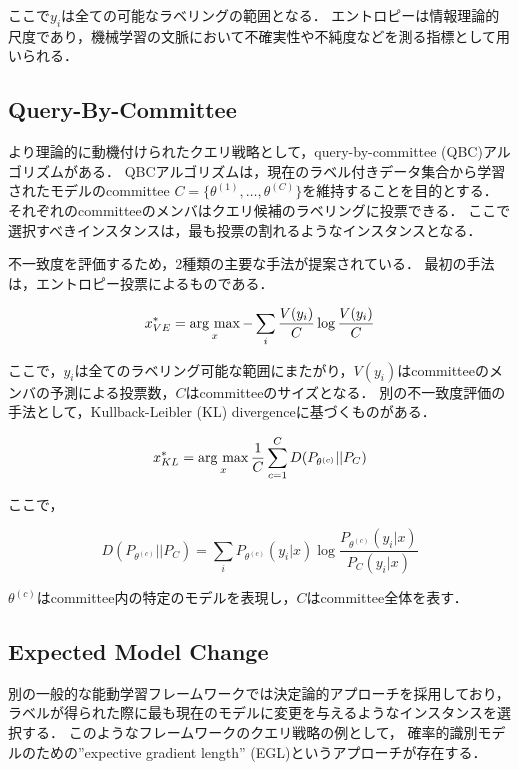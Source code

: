 \documentclass[11pt]{report}
\newcommand{\argmax}{\mathop{\rm arg~max}\limits}
\begin{document}
ここで$y_i$は全ての可能なラベリングの範囲となる．
エントロピーは情報理論的尺度であり，機械学習の文脈において不確実性や不純度などを測る指標として用いられる．

\subsection{Query-By-Committee}
より理論的に動機付けられたクエリ戦略として，query-by-committee (QBC)アルゴリズム\cite{seung1992query}がある．
QBCアルゴリズムは，現在のラベル付きデータ集合から学習されたモデルのcommittee $C = \{\theta^{(1)},\ldots,\theta^{(C)} \}$を維持することを目的とする．
それぞれのcommitteeのメンバはクエリ候補のラベリングに投票できる．
ここで選択すべきインスタンスは，最も投票の割れるようなインスタンスとなる．

不一致度を評価するため，2種類の主要な手法が提案されている．
最初の手法は，エントロピー投票によるものである\cite{dagan1995committee}．

\begin{equation}
    x_{VE}^* = \argmax_{x} - \sum_{i} \frac{V(y_i)}{C} \log \frac{V(y_i)}{C}
\end{equation}

ここで，$y_i$は全てのラベリング可能な範囲にまたがり，$V(y_i)$はcommitteeのメンバの予測による投票数，$C$はcommitteeのサイズとなる．
別の不一致度評価の手法として，Kullback-Leibler (KL) divergenceに基づくものがある\cite{mccallumzy1998employing}．

\begin{equation}
    x_{KL}^* = \argmax_{x} \frac{1}{C} \sum^{C}_{c=1} D(P_{\theta^{(c)}}||P_{C})
\end{equation}

ここで，

\begin{equation}
    D(P_{\theta^{(c)}}||P_{C}) = \sum_{i} P_{\theta^{(c)}}(y_i|x) \log \frac{P_{\theta^{(c)}}(y_i|x)}{P_C(y_i|x)}
\end{equation}

$\theta^{(c)}$はcommittee内の特定のモデルを表現し，$C$はcommittee全体を表す．

\subsection{Expected Model Change}
別の一般的な能動学習フレームワークでは決定論的アプローチを採用しており，ラベルが得られた際に最も現在のモデルに変更を与えるようなインスタンスを選択する．
このようなフレームワークのクエリ戦略の例として，
確率的識別モデルのための''expective gradient length'' (EGL)というアプローチが存在する\cite{settles2008multiple}．
\end{document}
